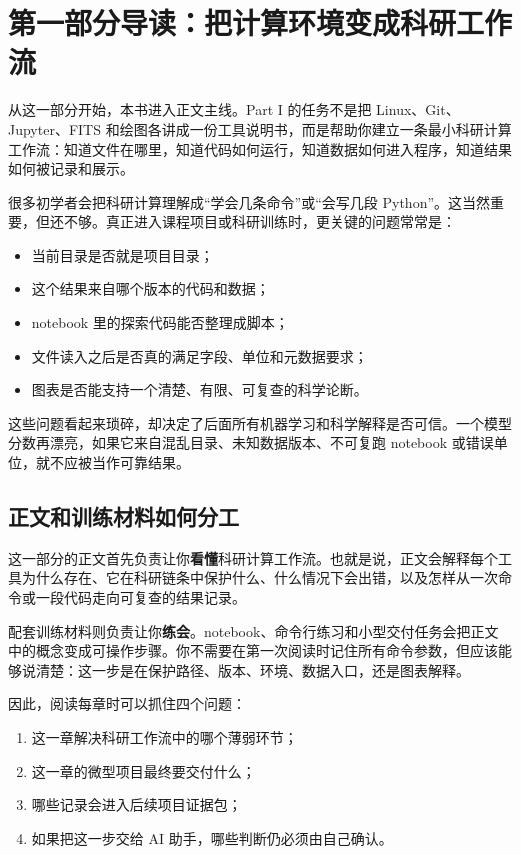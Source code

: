 \chapter*{第一部分导读：把计算环境变成科研工作流}

从这一部分开始，本书进入正文主线。Part I 的任务不是把 Linux、Git、Jupyter、FITS 和绘图各讲成一份工具说明书，而是帮助你建立一条最小科研计算工作流：知道文件在哪里，知道代码如何运行，知道数据如何进入程序，知道结果如何被记录和展示。

很多初学者会把科研计算理解成“学会几条命令”或“会写几段 Python”。这当然重要，但还不够。真正进入课程项目或科研训练时，更关键的问题常常是：

\begin{itemize}
    \item 当前目录是否就是项目目录；
    \item 这个结果来自哪个版本的代码和数据；
    \item notebook 里的探索代码能否整理成脚本；
    \item 文件读入之后是否真的满足字段、单位和元数据要求；
    \item 图表是否能支持一个清楚、有限、可复查的科学论断。
\end{itemize}

这些问题看起来琐碎，却决定了后面所有机器学习和科学解释是否可信。一个模型分数再漂亮，如果它来自混乱目录、未知数据版本、不可复跑 notebook 或错误单位，就不应被当作可靠结果。

\section*{正文和训练材料如何分工}

这一部分的正文首先负责让你\textbf{看懂}科研计算工作流。也就是说，正文会解释每个工具为什么存在、它在科研链条中保护什么、什么情况下会出错，以及怎样从一次命令或一段代码走向可复查的结果记录。

配套训练材料则负责让你\textbf{练会}。notebook、命令行练习和小型交付任务会把正文中的概念变成可操作步骤。你不需要在第一次阅读时记住所有命令参数，但应该能够说清楚：这一步是在保护路径、版本、环境、数据入口，还是图表解释。

因此，阅读每章时可以抓住四个问题：

\begin{enumerate}
    \item 这一章解决科研工作流中的哪个薄弱环节；
    \item 这一章的微型项目最终要交付什么；
    \item 哪些记录会进入后续项目证据包；
    \item 如果把这一步交给 AI 助手，哪些判断仍必须由自己确认。
\end{enumerate}

